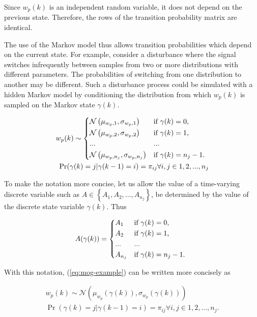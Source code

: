 Since $w_{p}(k)$ is an independent random variable, it does not depend on the previous state. Therefore, the rows of the transition probability matrix are identical. 

The use of the Markov model thus allows transition probabilities which depend on the current state. For example, consider a disturbance where the signal switches infrequently between samples from two or more distributions with different parameters. The probabilities of switching from one distribution to another may be different. Such a disturbance process could be simulated with a hidden Markov model by conditioning the distribution from which $w_p(k)$ is sampled on the Markov state $\gamma(k)$.

\begin{equation} \label{eq:mog-example}
	\begin{split}
		w_p(k) \sim 
		\begin{cases*}
			\mathcal{N}\left(\mu_{w_p,1}, \sigma_{w_p,1}\right) & if $\gamma(k)=0$, \\
			\mathcal{N}\left(\mu_{w_p,2}, \sigma_{w_p,2}\right) & if $\gamma(k)=1$, \\
			... & ...\\
			\mathcal{N}\left(\mu_{w_p,n_j}, \sigma_{w_p,n_j}\right) & if $\gamma(k)=n_j-1$.
		\end{cases*} \\
	\Pr(\gamma(k)=j|\gamma(k-1)=i)=\pi_{ij} \forall i,j \in {1,2,...,n_j}
	\end{split}
\end{equation}

To make the notation more concise, let us allow the value of a time-varying discrete variable such as $A\in\left\{A_1,A_2,...,A_{n_j}\right\}$, be determined by the value of the discrete state variable $\gamma(k)$. Thus

\begin{equation} \label{eq:A-selection}
	A(\gamma(k)) = 
	\begin{cases*}
		A_1 & if $\gamma(k)=0$, \\
		A_2 & if $\gamma(k)=1$, \\
		... & ...\\
		A_{n_j} & if $\gamma(k)=n_j-1$.
	\end{cases*}
\end{equation}


With this notation, (\ref{eq:mog-example}) can be written more concisely as

\begin{equation} \label{eq:mog-example2}
	\begin{split}
		w_p(k) \sim \mathcal{N}\left(\mu_{w_p}(\gamma(k)), \sigma_{w_p}(\gamma(k))\right) \\
		\Pr(\gamma(k)=j|\gamma(k-1)=i)=\pi_{ij} \forall i,j \in {1,2,...,n_j}.
	\end{split}
\end{equation}

